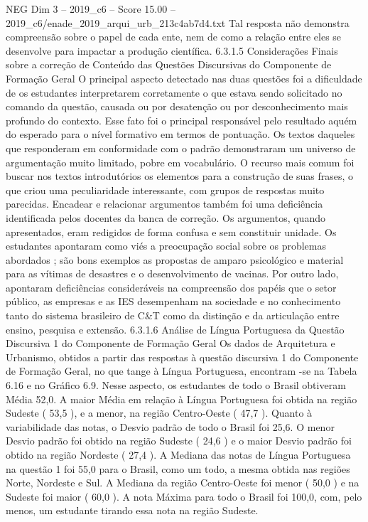\begin{textsample}{NEG Dim 3 – 2019\_c6 – Score 15.00 – 2019\_c6/enade\_2019\_arqui\_urb\_213c4ab7d4.txt}
Tal resposta não demonstra compreensão sobre o papel de cada ente, nem de como a relação entre eles se desenvolve para impactar a produção científica. 6.3.1.5 Considerações Finais sobre a correção de Conteúdo das Questões Discursivas do Componente de Formação Geral O principal aspecto detectado nas duas questões foi a dificuldade de os estudantes interpretarem corretamente o que estava sendo solicitado no comando da questão, causada ou por desatenção ou por desconhecimento mais profundo do contexto.
Esse fato foi o principal responsável pelo resultado aquém do esperado para o nível formativo em termos de pontuação.
Os textos daqueles que responderam em conformidade com o padrão demonstraram um universo de argumentação muito limitado, pobre em vocabulário.
O recurso mais comum foi buscar nos textos introdutórios os elementos para a construção de suas frases, o que criou uma peculiaridade interessante, com grupos de respostas muito parecidas.
Encadear e relacionar argumentos também foi uma deficiência identificada pelos docentes da banca de correção.
Os argumentos, quando apresentados, eram redigidos de forma confusa e sem constituir unidade.
Os estudantes apontaram como viés a preocupação social sobre os problemas abordados ; são bons exemplos as propostas de amparo psicológico e material para as vítimas de desastres e o desenvolvimento de vacinas.
Por outro lado, apontaram deficiências consideráveis na compreensão dos papéis que o setor público, as empresas e as IES desempenham na sociedade e no conhecimento tanto do sistema brasileiro de C\&T como da distinção e da articulação entre ensino, pesquisa e extensão. 6.3.1.6 Análise de Língua Portuguesa da Questão Discursiva 1 do Componente de Formação Geral Os dados de Arquitetura e Urbanismo, obtidos a partir das respostas à questão discursiva 1 do Componente de Formação Geral, no que tange à Língua Portuguesa, encontram -se na Tabela 6.16 e no Gráfico 6.9.
Nesse aspecto, os estudantes de todo o Brasil obtiveram Média 52,0.
A maior Média em relação à Língua Portuguesa foi obtida na região Sudeste ( 53,5 ), e a menor, na região Centro-Oeste ( 47,7 ).
Quanto à variabilidade das notas, o Desvio padrão de todo o Brasil foi 25,6.
O menor Desvio padrão foi obtido na região Sudeste ( 24,6 ) e o maior Desvio padrão foi obtido na região Nordeste ( 27,4 ).
A Mediana das notas de Língua Portuguesa na questão 1 foi 55,0 para o Brasil, como um todo, a mesma obtida nas regiões Norte, Nordeste e Sul.
A Mediana da região Centro-Oeste foi menor ( 50,0 ) e na Sudeste foi maior ( 60,0 ).
A nota Máxima para todo o Brasil foi 100,0, com, pelo menos, um estudante tirando essa nota na região Sudeste.

\end{textsample}
